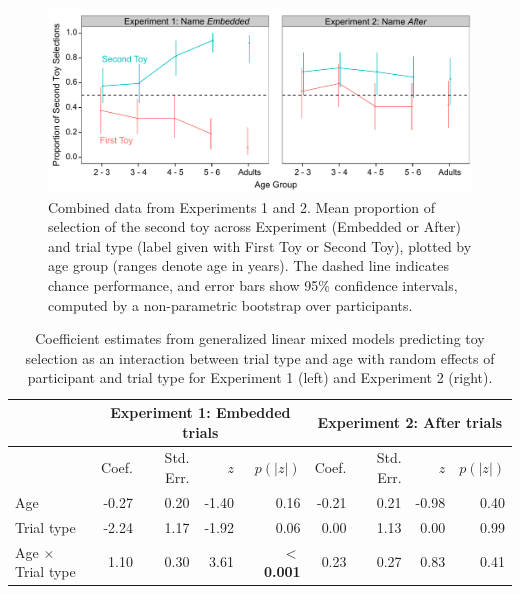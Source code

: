 \documentclass[man]{apa2}
\begin{document}
\begin{figure}
  \begin{center} 
    \includegraphics[width=6in]{figures/continuity_kids_and_adults_final.pdf} 
    \caption{\label{fig:res5} Combined data from Experiments 1 and 2.  Mean proportion of selection of the second toy across Experiment (Embedded or After) and trial type (label given with First Toy or Second Toy), plotted by age group (ranges denote age in years). The dashed line indicates chance performance, and error bars show 95\% confidence intervals, computed by a non-parametric bootstrap over participants.} 
  \end{center} 
\end{figure}	



  \begin{table} [t]
   \caption{Coefficient estimates from generalized linear mixed models predicting toy selection as an interaction between trial type and age with random effects of participant and trial type for Experiment 1 (left) and Experiment 2 (right).
   \label{tab:coefficient_estimates} } 
   \begin{center} 
     \begin{tabular}{lrrrr|rrrr} 
          & \multicolumn{4}{c}{Experiment 1: Embedded trials} &  \multicolumn{4}{c}{Experiment 2: After trials}\\
                      \hline 
       \null  & Coef. & Std. Err. & $z$  &  $p(|z|)$ & Coef. & Std. Err. & $z$  &  $p(|z|)$  \\ 
       \hline  
        Age   & -0.27 	&  0.20 & -1.40 & 0.16						               & -0.21 & 0.21 & -0.98 & 0.40\\ 
        Trial type   & -2.24 & 1.17 &  -1.92 & 0.06				                       & 0.00 & 1.13 & 0.00 & 0.99 \\
        Age $\times$ Trial type    & 1.10 & 0.30 & 3.61 &\textbf{ $<$0.001} 		& 0.23 & 0.27 & 0.83 & 0.41\\ 
       \hline 
     \end{tabular} 
  \end{center}
 \end{table}
 
\end{document}
